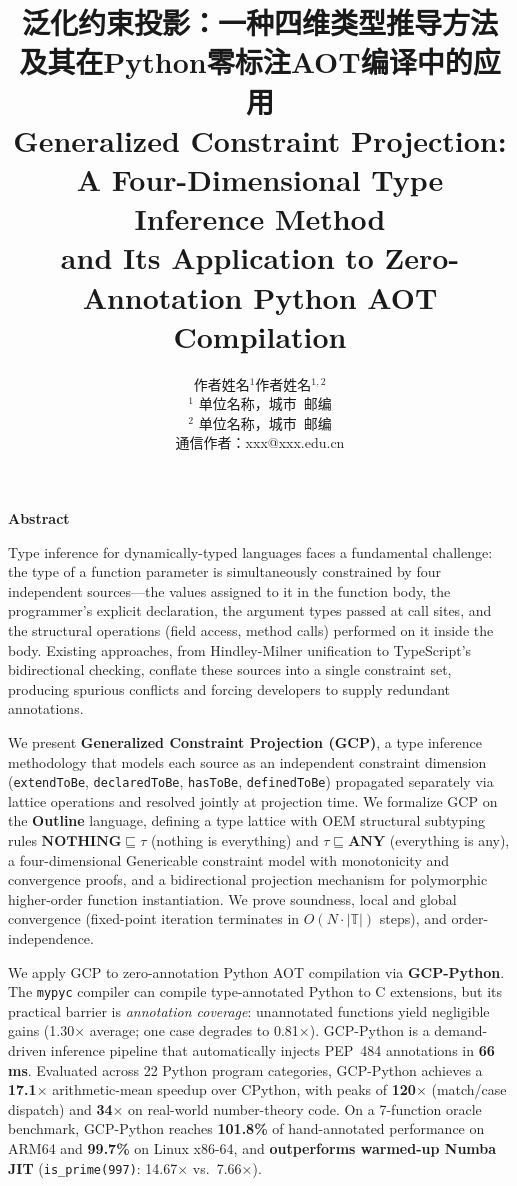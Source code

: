 \documentclass[UTF8]{article}
\title{\textbf{泛化约束投影：一种四维类型推导方法\\及其在Python零标注AOT编译中的应用}\\[0.5em]
{\large Generalized Constraint Projection: A Four-Dimensional Type Inference Method\\
and Its Application to Zero-Annotation Python AOT Compilation}}
\author{
  作者姓名$^{1}$\quad 作者姓名$^{1,2}$\\[0.3em]
  \small $^{1}$ 单位名称，城市\ 邮编\\
  \small $^{2}$ 单位名称，城市\ 邮编\\[0.3em]
  \small 通信作者：xxx@xxx.edu.cn
}
\date{}
\newcommand{\NOTHING}{\mathbf{NOTHING}}
\newcommand{\ANY}{\mathbf{ANY}}
\begin{document}
\maketitle

\begin{center}
  \textbf{Abstract}
\end{center}

\noindent
Type inference for dynamically-typed languages faces a fundamental challenge: the type of a function parameter is simultaneously constrained by four independent sources---the values assigned to it in the function body, the programmer's explicit declaration, the argument types passed at call sites, and the structural operations (field access, method calls) performed on it inside the body. Existing approaches, from Hindley-Milner unification to TypeScript's bidirectional checking, conflate these sources into a single constraint set, producing spurious conflicts and forcing developers to supply redundant annotations.

\medskip\noindent
We present \textbf{Generalized Constraint Projection (GCP)}, a type inference methodology that models each source as an independent constraint dimension (\texttt{extendToBe}, \texttt{declaredToBe}, \texttt{hasToBe}, \texttt{definedToBe}) propagated separately via lattice operations and resolved jointly at projection time. We formalize GCP on the \textbf{Outline} language, defining a type lattice with OEM structural subtyping rules $\NOTHING \sqsubseteq \tau$ (nothing is everything) and $\tau \sqsubseteq \ANY$ (everything is any), a four-dimensional Genericable constraint model with monotonicity and convergence proofs, and a bidirectional projection mechanism for polymorphic higher-order function instantiation. We prove soundness, local and global convergence (fixed-point iteration terminates in $O(N \cdot |\mathbb{T}|)$ steps), and order-independence.

\medskip\noindent
We apply GCP to zero-annotation Python AOT compilation via \textbf{GCP-Python}. The \texttt{mypyc} compiler can compile type-annotated Python to C extensions, but its practical barrier is \emph{annotation coverage}: unannotated functions yield negligible gains (1.30$\times$ average; one case degrades to 0.81$\times$). GCP-Python is a demand-driven inference pipeline that automatically injects PEP~484 annotations in \textbf{66\,ms}. Evaluated across 22 Python program categories, GCP-Python achieves a \textbf{17.1$\times$} arithmetic-mean speedup over CPython, with peaks of \textbf{120$\times$} (match/case dispatch) and \textbf{34$\times$} on real-world number-theory code. On a 7-function oracle benchmark, GCP-Python reaches \textbf{101.8\%} of hand-annotated performance on ARM64 and \textbf{99.7\%} on Linux x86-64, and \textbf{outperforms warmed-up Numba JIT} (\texttt{is\_prime(997)}: 14.67$\times$ vs.\ 7.66$\times$).
\end{document}
